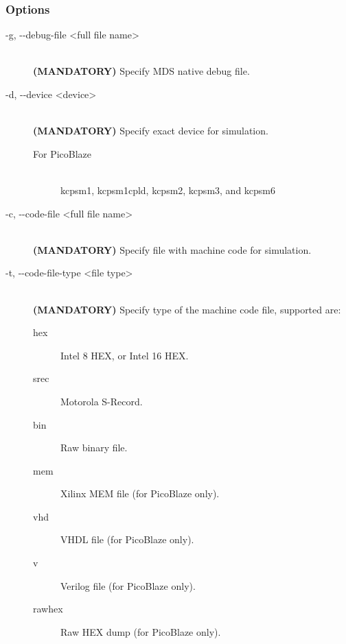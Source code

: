         \subsubsection{Options}
            \begin{description}
                \item[-g, -{}-debug-file <full file name>]~\\
                    \textbf{(MANDATORY)} Specify MDS native debug file.

                \item[-d, -{}-device <device>]~\\
                    \textbf{(MANDATORY)} Specify exact device for simulation.
                        \begin{description}
                            \item[For PicoBlaze]~\\
                                kcpsm1, kcpsm1cpld, kcpsm2, kcpsm3, and kcpsm6
                        \end{description}

                \item[-c, -{}-code-file <full file name>]~\\
                    \textbf{(MANDATORY)} Specify file with machine code for simulation.

                \item[-t, -{}-code-file-type <file type>]~\\
                    \textbf{(MANDATORY)} Specify type of the machine code file, supported are:
                        \begin{description}
                            \item [hex] Intel 8 HEX, or Intel 16 HEX.
                            \item [srec] Motorola S-Record.
                            \item [bin] Raw binary file.
                            \item [mem] Xilinx MEM file (for PicoBlaze only).
                            \item [vhd] VHDL file (for PicoBlaze only).
                            \item [v] Verilog file (for PicoBlaze only).
                            \item [rawhex] Raw HEX dump (for PicoBlaze only).
                        \end{description}


\end{description}
